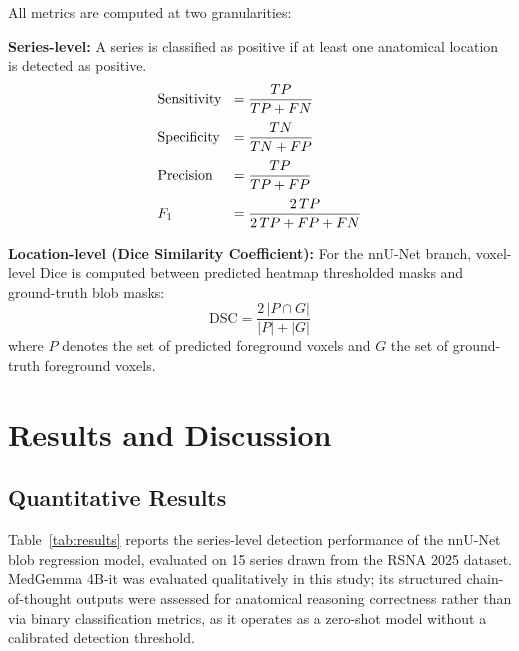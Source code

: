 \documentclass[journal]{IEEEtran}
\begin{document}
All metrics are computed at two granularities:

\textbf{Series-level:} A series is classified as positive if at least one
anatomical location is detected as positive.
{\small
\begin{align}
  \makebox[5.2em][l]{\text{Sensitivity}} &= \frac{TP}{TP + FN} \\[2pt]
  \makebox[5.2em][l]{\text{Specificity}} &= \frac{TN}{TN + FP} \\[2pt]
  \makebox[5.2em][l]{\text{Precision}}   &= \frac{TP}{TP + FP} \\[2pt]
  \makebox[5.2em][l]{$F_1$}              &= \frac{2\,TP}{2\,TP + FP + FN}
\end{align}
}

\textbf{Location-level (Dice Similarity Coefficient):}
For the nnU-Net branch, voxel-level Dice is computed between predicted heatmap
thresholded masks and ground-truth blob masks:
\begin{equation}
  \text{DSC} = \frac{2\,|P \cap G|}{|P| + |G|}
\end{equation}
where $P$ denotes the set of predicted foreground voxels and $G$ the set of
ground-truth foreground voxels.

\section{Results and Discussion}
\label{sec:results}

\subsection{Quantitative Results}

Table~\ref{tab:results} reports the series-level detection performance of the
nnU-Net blob regression model, evaluated on 15 series drawn from the RSNA 2025
dataset. MedGemma 4B-it was evaluated qualitatively in this study;
its structured chain-of-thought outputs were assessed for anatomical reasoning
correctness rather than via binary classification metrics, as it operates as a
zero-shot model without a calibrated detection threshold.
\end{document}
